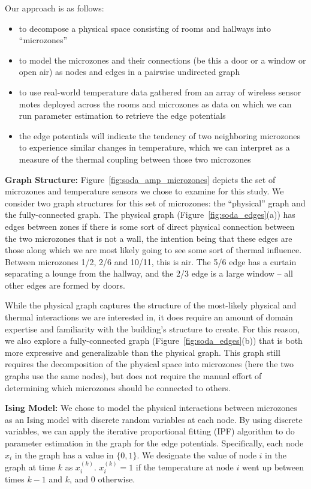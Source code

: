 Our approach is as follows:

\begin{itemize}[noitemsep, nolistsep]
\item to decompose a physical space consisting of rooms and hallways into ``microzones''
\item to model the microzones and their connections (be this a door or a window or open air) as nodes and edges in a pairwise undirected graph
\item to use real-world temperature data gathered from an array of wireless sensor motes deployed across the rooms and microzones as data on which we can run parameter estimation to retrieve the edge potentials
\item the edge potentials will indicate the tendency of two neighboring microzones to experience similar changes in temperature, which we can interpret as a measure of the thermal coupling between those two microzones
\end{itemize}

\textbf{Graph Structure:} Figure~\ref{fig:soda_amp_microzones} depicts the set of microzones and temperature sensors we chose to examine for this study.
We consider two graph structures for this set of microzones: the ``physical'' graph and the fully-connected graph.
The physical graph (Figure~\ref{fig:soda_edges}(a)) has edges between zones if there is some sort of direct physical connection between the two microzones that is not a wall, the intention being that these edges are those along which we are most likely going to see some sort of thermal influence.
Between microzones 1/2, 2/6 and 10/11, this is air.
The 5/6 edge has a curtain separating a lounge from the hallway, and the 2/3 edge is a large window -- all other edges are formed by doors.

While the physical graph captures the structure of the most-likely physical and thermal interactions we are interested in, it does require an amount of domain expertise and familiarity with the building's structure to create.
For this reason, we also explore a fully-connected graph (Figure~\ref{fig:soda_edges}(b)) that is both more expressive and generalizable than the physical graph.
This graph still requires the decomposition of the physical space into microzones (here the two graphs use the same nodes), but does not require the manual effort of determining which microzones should be connected to others.

\textbf{Ising Model:} We chose to model the physical interactions between microzones as an Ising model with discrete random variables at each node.
By using discrete variables, we can apply the iterative proportional fitting (IPF) algorithm to do parameter estimation in the graph for the edge potentials.
Specifically, each node $x_i$ in the graph has a value in $\lbrace 0, 1\rbrace$.
We designate the value of node $i$ in the graph at time $k$ as $x_i^{(k)}$.
$x_i^{(k)} = 1$ if the temperature at node $i$ went up between times $k-1$  and $k$, and 0 otherwise.

